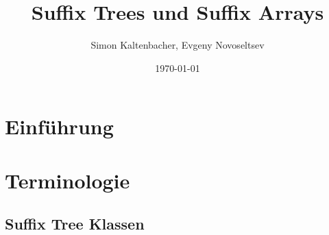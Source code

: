 \documentclass{beamer}
\title{Suffix Trees und Suffix Arrays}
\author{Simon Kaltenbacher, Evgeny Novoseltsev}
\date{\today}
\begin{document}
\frame{\titlepage}


\section{Einführung}

\section{Terminologie}

\subsection{Suffix Tree Klassen}
\end{document}
